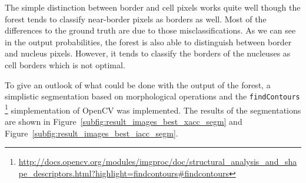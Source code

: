 The simple distinction between border and cell pixels works quite well though the forest
tends to classify near-border pixels as borders as well. Most of the differences to the
ground truth are due to those misclassifications. As we can see in the output probabilities,
the forest is also able to distinguish between border and nucleus pixels. However, it tends
to classify the borders of the nucleuses as cell borders which is not optimal. 

To give an outlook of what could be done with the output of the forest, a simplistic segmentation
based on morphological operations and the \texttt{findContours}
\footnote{\url{http://docs.opencv.org/modules/imgproc/doc/structural_analysis_and_shape_descriptors.html?highlight=findcontours\#findcontours}}
simplementation of OpenCV was implemented.
The results of the segmentations are shown in Figure~\ref{subfig:result_images_best_xacc_segm}
and Figure~\ref{subfig:result_images_best_iacc_segm}. 